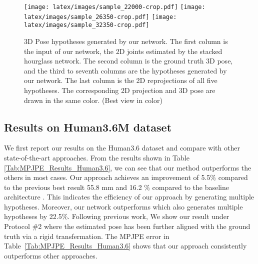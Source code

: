 \documentclass[10pt,twocolumn,letterpaper]{article}
\begin{document}
\begin{figure*}[ht]
\begin{center}
\texttt{[image: latex/images/sample\_22000-crop.pdf]}
\texttt{[image: latex/images/sample\_26350-crop.pdf]}
\texttt{[image: latex/images/sample\_32350-crop.pdf]}


\end{center}
\vspace{-3mm}
   \caption{3D Pose hypotheses generated by our network. The first column is the input of our network, \ie the 2D joints estimated by the stacked hourglass network. The second column is the ground truth 3D pose, and the third to seventh columns are the hypotheses generated by our network. The last column is the 2D reprojections of all five hypotheses. The corresponding 2D projection and 3D pose are drawn in the same color. (Best view in color) }
  
   
\label{fig:hypotheses}
\vspace{-2mm}
\end{figure*}

\subsection{Results on Human3.6M dataset}
We first report our results on the Human3.6 dataset and compare with other state-of-the-art approaches. From the results shown in Table \ref{Tab:MPJPE_Results_Human3.6}, we can see that our method outperforms the others in most cases. Our approach achieves an improvement of  5.5\% compared to the previous best result 55.8 mm \cite{lee2018propagating} and 16.2 \% compared to the baseline architecture \cite{martinez2017simple}. This indicates the efficiency of our approach by generating multiple hypotheses. Moreover, our network outperforms \cite{jahangiri2017generating} which also generates multiple hypotheses by 22.5\%. Following previous work, We show our result under Protocol \#2 \cite{bogo2016keep, moreno20173d} where the estimated pose has been further aligned with the ground truth via a rigid transfermation. The MPJPE error in Table~\ref{Tab:MPJPE_Results_Human3.6} shows that our approach consistently outperforms other approaches. 
\end{document}
